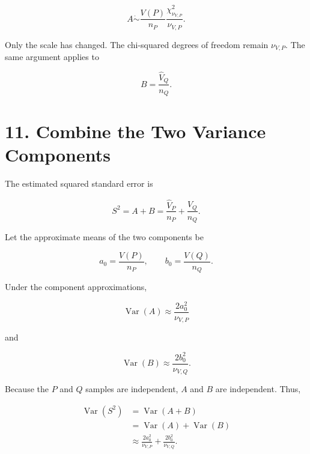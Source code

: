 \documentclass[
  11pt]{article}
\let\originalsection\section
\renewcommand{\section}{\clearpage\originalsection}
\begin{document}
\begin{equation}
A
\mathrel{\dot\sim}
\frac{V(P)}{n_P}
\frac{\chi^2_{\nu_{V,P}}}{\nu_{V,P}}.
\end{equation}

Only the scale has changed. The chi-squared degrees of freedom remain
\(\nu_{V,P}\). The same argument applies to

\begin{equation}
B=\frac{\widehat V_Q}{n_Q}.
\end{equation}

\section{11. Combine the Two Variance
Components}\label{combine-the-two-variance-components}

The estimated squared standard error is

\begin{equation}
S^2=A+B
=\frac{\widehat V_P}{n_P}
+\frac{\widehat V_Q}{n_Q}.
\end{equation}

Let the approximate means of the two components be

\begin{equation}
a_0=\frac{V(P)}{n_P},
\qquad
b_0=\frac{V(Q)}{n_Q}.
\end{equation}

Under the component approximations,

\begin{equation}
\operatorname{Var}(A)
\approx\frac{2a_0^2}{\nu_{V,P}}
\end{equation}

and

\begin{equation}
\operatorname{Var}(B)
\approx\frac{2b_0^2}{\nu_{V,Q}}.
\end{equation}

Because the \(P\) and \(Q\) samples are independent, \(A\) and \(B\) are
independent. Thus,

\begin{equation}
\begin{aligned}
\operatorname{Var}(S^2)
&=\operatorname{Var}(A+B)\\
&=\operatorname{Var}(A)+\operatorname{Var}(B)\\
&\approx
\frac{2a_0^2}{\nu_{V,P}}
+\frac{2b_0^2}{\nu_{V,Q}}.
\end{aligned}
\end{equation}
\end{document}
